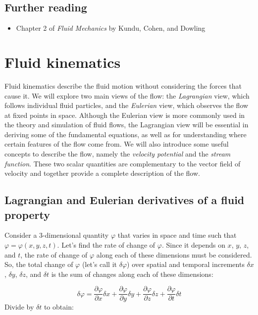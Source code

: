 \documentclass[12pt]{article}
\numberwithin{equation}{section}
\numberwithin{figure}{section}
\numberwithin{table}{section}
\begin{document}
\subsection*{Further reading}

\begin{itemize}
  \item Chapter 2 of \textit{Fluid Mechanics} by Kundu, Cohen, and Dowling
\end{itemize}

\newpage
\section{Fluid kinematics}

Fluid kinematics describe the fluid motion without considering the forces that
cause it.
We will explore two main views of the flow: the \textit{Lagrangian}
view, which follows individual fluid particles, and the \textit{Eulerian}
view, which observes the flow at fixed points in space.
Although the Eulerian view is more commonly used in the theory and simulation
of fluid flows, the Lagrangian view will be essential in deriving some of the
fundamental equations, as well as for understanding where certain features of
the flow come from.
We will also introduce some useful concepts to describe the flow, namely
the \textit{velocity potential} and the \textit{stream function}.
These two scalar quantities are complementary to the vector field of velocity
and together provide a complete description of the flow.

\subsection{Lagrangian and Eulerian derivatives of a fluid property}

Consider a 3-dimensional quantity $\varphi$ that varies in space and time such that
$\varphi = \varphi(x, y, z, t)$.
Let's find the rate of change of $\varphi$.
Since it depends on $x$, $y$, $z$, and $t$, the rate of change of $\varphi$ along
each of these dimensions must be considered.
So, the total change of $\varphi$ (let's call it $\delta\varphi$) over spatial and
temporal increments $\delta x$, $\delta y$, $\delta z$, and $\delta t$ is the
sum of changes along each of these dimensions:

\begin{equation}
  \delta\varphi = \frac{\partial \varphi}{\partial x} \delta x +
    \frac{\partial \varphi}{\partial y} \delta y +
    \frac{\partial \varphi}{\partial z} \delta z +
    \frac{\partial \varphi}{\partial t} \delta t
\end{equation}
Divide by $\delta t$ to obtain:
\end{document}
